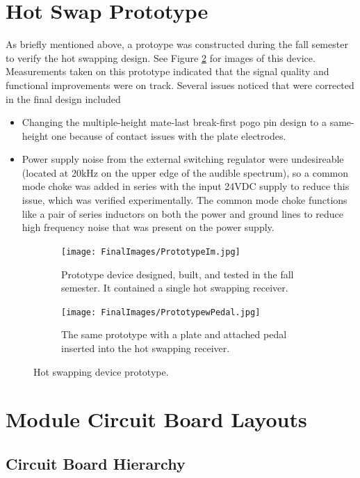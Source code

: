\section{Hot Swap Prototype}

	As briefly mentioned above, a protoype was constructed during the fall semester to verify the hot swapping design.  See Figure \ref{fig:prototype} for images of this device.  Measurements taken on this prototype indicated that the signal quality and functional improvements were on track.  Several issues noticed that were corrected in the final design included

	\begin{itemize}
		\item Changing the multiple-height mate-last break-first pogo pin design to a same-height one because of contact issues with the plate electrodes.
		\item Power supply noise from the external switching regulator were undesireable (located at 20kHz on the upper edge of the audible spectrum), so a common mode choke was added in series with the input 24VDC supply to reduce this issue, which was verified experimentally.  The common mode choke functions like a pair of series inductors on both the power and ground lines to reduce high frequency noise that was present on the power supply.
	\end{itemize}

	\begin{figure}
		\centering
		\begin{subfigure}{0.45\textwidth}
			\texttt{[image: FinalImages/PrototypeIm.jpg]}
			\caption{Prototype device designed, built, and tested in the fall semester.  It contained a single hot swapping receiver.}
		\end{subfigure}
		\begin{subfigure}{0.45\textwidth}
			\texttt{[image: FinalImages/PrototypewPedal.jpg]}
			\caption{The same prototype with a plate and attached pedal inserted into the hot swapping receiver.}
			\label{fig:NF_AP_sum}
		\end{subfigure}
		\caption{Hot swapping device prototype.}
		\label{fig:prototype}
	\end{figure}

\section{Module Circuit Board Layouts}

	\subsection{Circuit Board Hierarchy}


